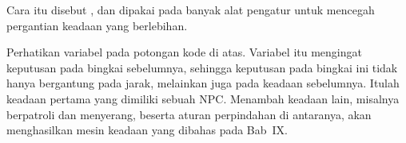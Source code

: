 Cara itu disebut , dan dipakai pada banyak alat pengatur
untuk mencegah pergantian keadaan yang berlebihan.

\begin{catatabox}
Perhatikan variabel  pada potongan kode di atas. Variabel itu
mengingat keputusan pada bingkai sebelumnya, sehingga keputusan pada bingkai
ini tidak hanya bergantung pada jarak, melainkan juga pada keadaan sebelumnya.
Itulah keadaan pertama yang dimiliki sebuah NPC. Menambah keadaan lain, misalnya
berpatroli dan menyerang, beserta aturan perpindahan di antaranya, akan
menghasilkan mesin keadaan yang dibahas pada Bab~IX.
\end{catatabox}
